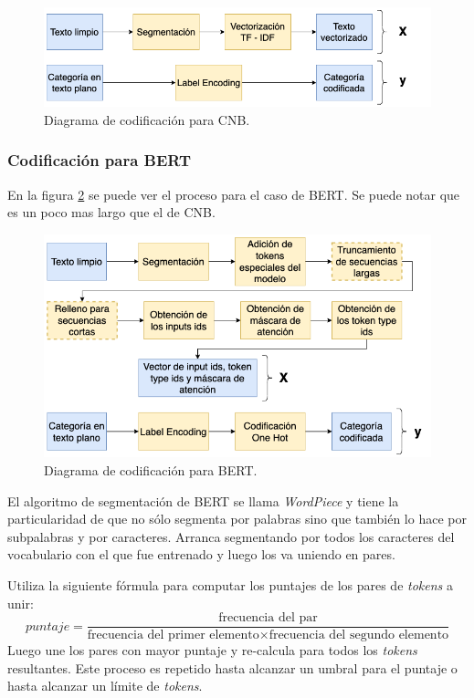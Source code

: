 \begin{figure}[htbp]
	\centering
	\includegraphics[width=.7\textwidth]{./Figures/pipeline-baseline.png}
	\caption{Diagrama de codificación para CNB.}
	\label{fig:pipeline-baseline}
\end{figure}

\subsubsection{Codificación para BERT}

En la figura \ref{fig:pipeline-bert} se puede ver el proceso para el caso de BERT. Se puede notar que es un poco mas largo que el de CNB.

\begin{figure}[htbp]
	\centering
	\includegraphics[width=.7\textwidth]{./Figures/pipeline-bert.png}
	\caption{Diagrama de codificación para BERT.}
	\label{fig:pipeline-bert}
\end{figure}

El algoritmo de segmentación de BERT se llama \textit{WordPiece} y tiene la particularidad de que no sólo segmenta por palabras sino que también lo hace por subpalabras y por caracteres. Arranca segmentando por todos los caracteres del vocabulario con el que fue entrenado y luego los va uniendo en pares. 

Utiliza la siguiente fórmula para computar los puntajes de los pares de \textit{tokens} a unir:
\begin{equation}
puntaje = \frac{\text{frecuencia del par}}{\text{frecuencia del primer elemento}\times \text{frecuencia del segundo elemento}}
\end{equation}
Luego une los pares con mayor puntaje y re-calcula para todos los \textit{tokens} resultantes. Este proceso es repetido hasta alcanzar un umbral para el puntaje o hasta alcanzar un límite de \textit{tokens}.

